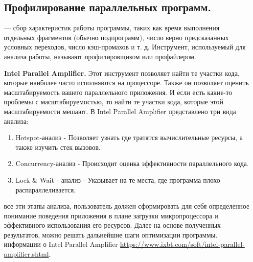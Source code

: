 { %
	\subsection{Профилирование параллельных программ.}
	 — сбор характеристик работы программы, таких как время выполнения отдельных фрагментов (обычно подпрограмм), число верно предсказанных условных переходов, число кэш-промахов и т. д. Инструмент, используемый для анализа работы, называют профилировщиком или профайлером.
	\par\textbf{Intel Parallel Amplifier.} Этот инструмент позволяет найти те участки кода, которые наиболее часто исполняются на процессоре. Также он позволяет оценить масштабируемость вашего параллельного приложения. И если есть какие-то проблемы с масштабируемостью, то найти те участки кода, которые этой масштабируемости мешают. В Intel Parallel Amplifier представлено три вида анализа:
    \begin{enumerate}
        \item Hotspot-анализ - Позволяет узнать где тратятся вычислительные ресурсы, а также изучить стек вызовов.
        \item Concurrency-анализ - Происходит оценка эффективности параллельного кода.
        \item Lock \& Wait - анализ - Указывает на те места, где программа плохо распараллеливается.
    \end{enumerate}
     все эти этапы анализа, пользователь должен сформировать для себя определенное понимание поведения приложения в плане загрузки микропроцессора и эффективного использования его ресурсов. Далее на основе полученных результатов, можно решать дальнейшие шаги оптимизации программы.
     информации о Intel Parallel Amplifier \url{https://www.ixbt.com/soft/intel-parallel-amplifier.shtml}.
}